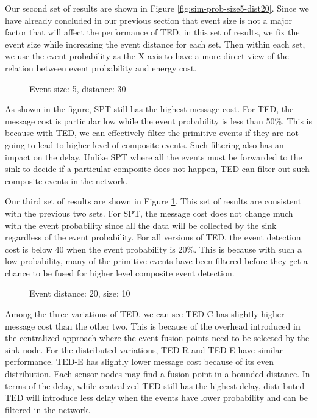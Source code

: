 Our second set of results are shown in Figure \ref{fig:sim-prob-size5-dist20}. Since we have already concluded in our previous section that event size is not a major factor that will affect the performance of TED, in this set of results, we fix the event size while increasing the event distance for each set. Then within each set, we use the event probability as the X-axis to have a more direct view of the relation between event probability and energy cost.

\begin{figure}
\centering
{}
\caption{Event size: 5, distance: 30}
\label{fig:sim-prob-size5-dist30}
\end{figure}

As shown in the figure, SPT still has the highest message cost. For TED, the message cost is particular low while the event probability is less than 50\%. This is because with TED, we can effectively filter the primitive events if they are not going to lead to higher level of composite events. Such filtering also has an impact on the delay. Unlike SPT where all the events must be forwarded to the sink to decide if a particular composite does not happen, TED can filter out such composite events in the network. 

Our third set of results are shown in Figure \ref{fig:sim-prob-size5-dist30}. This set of results are consistent with the previous two sets. For SPT, the message cost does not change much with the event probability since all the data will be collected by the sink regardless of the event probability. For all versions of TED, the event detection cost is below 40 when the event probability is 20\%. This is because with such a low probability, many of the primitive events have been filtered before they get a chance to be fused for higher level composite event detection.

\begin{figure}
\centering
{}
\caption{Event distance: 20, size: 10}
\label{fig:sim-prob-dist20-size10}
\end{figure}

Among the three variations of TED, we can see TED-C has slightly higher message cost than the other two. This is because of the overhead introduced in the centralized approach where the event fusion points need to be selected by the sink node. For the distributed variations, TED-R and TED-E have similar performance. TED-E has slightly lower message cost because of its even distribution. Each sensor nodes may find a fusion point in a bounded distance. In terms of the delay, while centralized TED still has the highest delay, distributed TED will introduce less delay when the events have lower probability and can be filtered in the network.

